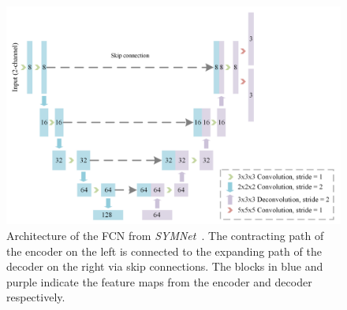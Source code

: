 \begin{figure}[h] %
	\centering
	\graphicspath{{images/}{\main/images/}}
	\includegraphics[width=\linewidth]{SYMNetArchitectureFCN.png} 
	\caption{Architecture of the FCN from \emph{SYMNet}~\cite{SYM-Net}. The contracting path of the encoder on the left is connected to the expanding path of the decoder on the right via skip connections. The blocks in blue and purple indicate the feature maps from the encoder and decoder respectively. }
	\label{fig:SYMNet}
\end{figure}


